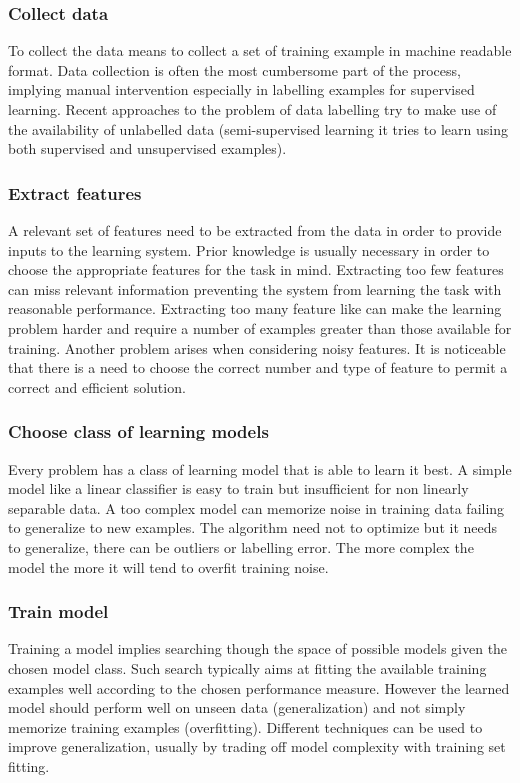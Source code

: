 		\subsubsection{Collect data}
		To collect the data means to collect a set of training example in machine readable format.
		Data collection is often the most cumbersome part of the process, implying manual intervention especially in labelling examples for supervised learning.
		Recent approaches to the problem of data labelling try to make use of the availability of unlabelled data (semi-supervised learning it tries to learn using both supervised and unsupervised examples).

		\subsubsection{Extract features}
		A relevant set of features need to be extracted from the data in order to provide inputs to the learning system.
		Prior knowledge is usually necessary in order to choose the appropriate features for the task in mind.
		Extracting too few features can miss relevant information preventing the system from learning the task with reasonable performance.
		Extracting too many feature like can make the learning problem harder and require a number of examples greater than those available for training.
		Another problem arises when considering noisy features.
		It is noticeable that there is a need to choose the correct number and type of feature to permit a correct and efficient solution.

		\subsubsection{Choose class of learning models}
		Every problem has a class of learning model that is able to learn it best.
		A simple model like a linear classifier is easy to train but insufficient for non linearly separable data.
		A too complex model can memorize noise in training data failing to generalize to new examples.
		The algorithm need not to optimize but it needs to generalize, there can be outliers or labelling error.
		The more complex the model the more it will tend to overfit training noise.

		\subsubsection{Train model}
		Training a model implies searching though the space of possible models given the chosen model class.
		Such search typically aims at fitting the available training examples well according to the chosen performance measure.
		However the learned model should perform well on unseen data (generalization) and not simply memorize training examples (overfitting).
		Different techniques can be used to improve generalization, usually by trading off model complexity with training set fitting.

